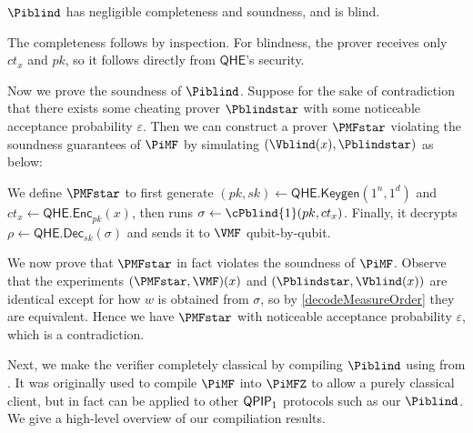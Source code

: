 \begin{thm}
	\label{thm:BlindBQP}
	$\Piblind$ has negligible completeness and soundness, and is blind.
\end{thm}
\begin{prf}
	The completeness follows by inspection.
	For blindness, the prover receives only $ct_x$ and $pk$, so it follows directly from $\mathsf{QHE}$'s security.
	
	Now we prove the soundness of $\Piblind$.
	Suppose for the sake of contradiction that there exists some cheating prover $\Pblindstar$ with some noticeable acceptance probability $\varepsilon$.
	Then we can construct a prover $\PMFstar$ violating the soundness guarantees of $\PiMF$ by simulating $(\Vblind(x), \Pblindstar)$ as below:

	We define $\PMFstar$ to first generate
	$(pk, sk)\leftarrow\mathsf{QHE.Keygen}(1^n, 1^d)$
	and
	$ct_x\leftarrow\mathsf{QHE.Enc}_{pk}(x)$,
	then runs $\sigma\leftarrow\cPblind{1}(pk, ct_x)$.
	Finally, it decrypts
	$\rho\leftarrow\mathsf{QHE.Dec}_{sk}(\sigma)$
	and sends it to $\VMF$ qubit-by-qubit.

	We now prove that $\PMFstar$ in fact violates the soundness of $\PiMF$.
	Observe that the experiments $(\PMFstar, \VMF)(x)$ and $(\Pblindstar, \Vblind(x))$ are identical except for how $w$ is obtained from $\sigma$,
	so by \cref{decodeMeasureOrder} they are equivalent.
	Hence we have $\PMFstar$ with noticeable acceptance probability $\varepsilon$, which is a contradiction.
\end{prf}


Next, we make the verifier completely classical by compiling $\Piblind$ using  from \cite{FOCS:Mahadev18a}.
It was originally used to compile $\PiMF$ into $\PiMFZ$ to allow a purely classical client,
but in fact can be applied to other $\operatorname{\mathsf{QPIP}}_1$ protocols such as our $\Piblind$.
We give a high-level overview of our compiliation results.

